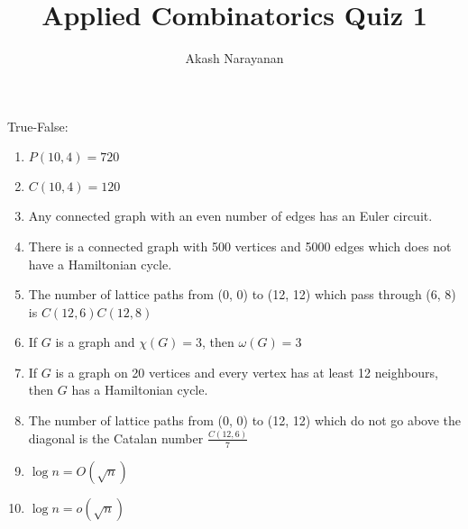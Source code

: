 \documentclass[12pt]{article}
\title{Applied Combinatorics Quiz 1}
\author{Akash Narayanan}
\begin{document}
 \maketitle

 True-False:

 \begin{enumerate}
   \item {} \(P(10, 4) = 720\)
   \item {} \(C(10, 4) = 120\)
   \item {} Any connected graph with an even number of edges has an Euler circuit.
   \item {} There is a connected graph with 500 vertices and 5000 edges which does not have a Hamiltonian cycle.
   \item {} The number of lattice paths from (0, 0) to (12, 12) which pass through (6, 8) is \(C(12, 6)C(12, 8)\)
   \item {} If \(G\) is a graph and \(\chi(G) = 3\), then \(\omega(G) = 3\)
   \item {} If \(G\) is a graph on 20 vertices and every vertex has at least 12 neighbours, then \(G\) has a Hamiltonian cycle.
   \item {} The number of lattice paths from (0, 0) to (12, 12) which do not go above the diagonal is the Catalan number \(\frac{C(12, 6)}{7}\)
   \item {} \(\log{}n = O(\sqrt{n})\)
   \item {} \(\log{}n = o(\sqrt{n})\)
 \end{enumerate}
\end{document}
